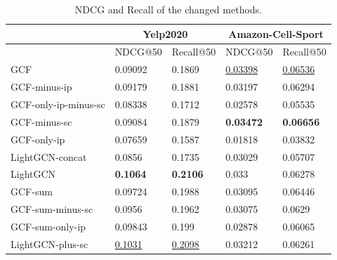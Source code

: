 \begin{table}[]
    \centering
    \begin{tabular}{|l|l|l|l|l|}
        \hline
                             & \multicolumn{2}{c|}{Yelp2020} & \multicolumn{2}{c|}{Amazon-Cell-Sport}                                             \\ \hline
                             & NDCG@50                       & Recall@50                              & NDCG@50             & Recall@50           \\ \hline
        GCF                  & 0.09092                       & 0.1869                                 & \underline{0.03398} & \underline{0.06536} \\ \hline
        GCF-minus-ip         & 0.09179                       & 0.1881                                 & 0.03197             & 0.06294             \\ \hline
        GCF-only-ip-minus-sc & 0.08338                       & 0.1712                                 & 0.02578             & 0.05535             \\ \hline
        GCF-minus-sc         & 0.09084                       & 0.1879                                 & \textbf{0.03472}    & \textbf{0.06656}    \\ \hline
        GCF-only-ip          & 0.07659                       & 0.1587                                 & 0.01818             & 0.03832             \\ \hline
        LightGCN-concat      & 0.0856                        & 0.1735                                 & 0.03029             & 0.05707             \\ \hline
        LightGCN             & \textbf{0.1064}               & \textbf{0.2106}                        & 0.033               & 0.06278             \\ \hline
        GCF-sum              & 0.09724                       & 0.1988                                 & 0.03095             & 0.06446             \\ \hline
        GCF-sum-minus-sc     & 0.0956                        & 0.1962                                 & 0.03075             & 0.0629              \\ \hline
        GCF-sum-only-ip      & 0.09843                       & 0.199                                  & 0.02878             & 0.06065             \\ \hline
        LightGCN-plus-sc     & \underline{0.1031}            & \underline{0.2098}                     & 0.03212             & 0.06261             \\ \hline
    \end{tabular}
    \caption{NDCG and Recall of the changed methods.}
    \label{tab:ablation-results}
\end{table}
